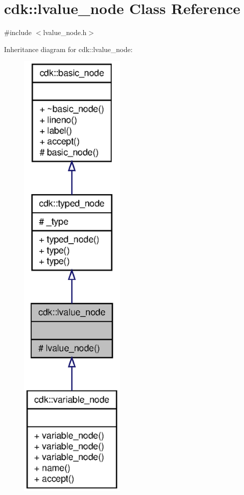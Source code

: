 \section{cdk\+:\+:lvalue\+\_\+node Class Reference}
\label{classcdk_1_1lvalue__node}


{\ttfamily \#include $<$lvalue\+\_\+node.\+h$>$}



Inheritance diagram for cdk\+:\+:lvalue\+\_\+node\+:
\nopagebreak
\begin{figure}[H]
\begin{center}
\leavevmode
\includegraphics[width=144pt]{classcdk_1_1lvalue__node__inherit__graph}
\end{center}
\end{figure}


